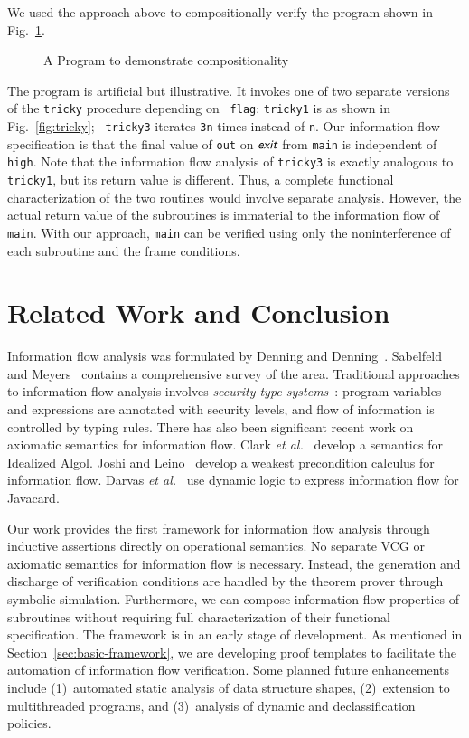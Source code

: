 \documentclass[conference]{IEEEtran}
\newcommand{\func}[1]{\ensuremath{\mbox{{\sf {\em #1}}}}}
\begin{document}
We used the approach above to compositionally verify the program
shown in Fig.~\ref{fig:main}.
\begin{figure}
\begin{center}
\fbox{
\begin{minipage}{3.0in}

\end{minipage}
}
\end{center}
\caption{A Program to demonstrate compositionality}
\label{fig:main}
\end{figure}
The program is artificial but illustrative.  It invokes one of two
separate versions of the {\tt tricky} procedure depending on {\tt
flag}: {\tt tricky1} is as shown in Fig.~\ref{fig:tricky}; {\tt
tricky3} iterates {\tt 3n} times instead of {\tt n}.  Our information
flow specification is that the final value of {\tt out} on \func{exit}
from {\tt main} is independent of {\tt high}.  Note that the
information flow analysis of {\tt tricky3} is exactly analogous to
{\tt tricky1}, but its return value is different.  Thus, a complete
functional characterization of the two routines would involve separate
analysis.  However, the actual return value of the subroutines is
immaterial to the information flow of {\tt main}.  With our approach,
{\tt main} can be verified using only the noninterference of each
subroutine and the frame conditions.


\section{Related Work and Conclusion}
\label{sec:related}

Information flow analysis was formulated by Denning and
Denning~\cite{denning}.  Sabelfeld and Meyers~\cite{sm} contains a
comprehensive survey of the area.  Traditional approaches to
information flow analysis involves {\em security type
systems}~\cite{palsberg,volpano}: program variables and expressions
are annotated with security levels, and flow of information is controlled
by typing rules.  There has also been significant recent work on
axiomatic semantics for information flow.  Clark {\em et
al.}~\cite{clark} develop a semantics for Idealized Algol.  Joshi and
Leino~\cite{joshi} develop a weakest precondition calculus for
information flow.  Darvas {\em et al.}~\cite{darvas} use dynamic logic
to express information flow for Javacard.

Our work provides the first framework for information flow analysis
through inductive assertions directly on operational semantics.  No
separate VCG or axiomatic semantics for information flow is necessary.
Instead, the generation and discharge of verification conditions are
handled by the theorem prover through symbolic simulation.
Furthermore, we can compose information flow properties of subroutines
without requiring full characterization of their functional
specification.  The framework is in an early stage of development.
As mentioned in Section~\ref{sec:basic-framework}, we are developing
proof templates to facilitate the automation of information flow
verification.  Some planned future enhancements include (1)~automated
static analysis of data structure shapes, (2)~extension to
multithreaded programs, and (3)~analysis of dynamic and
declassification policies.
\end{document}
